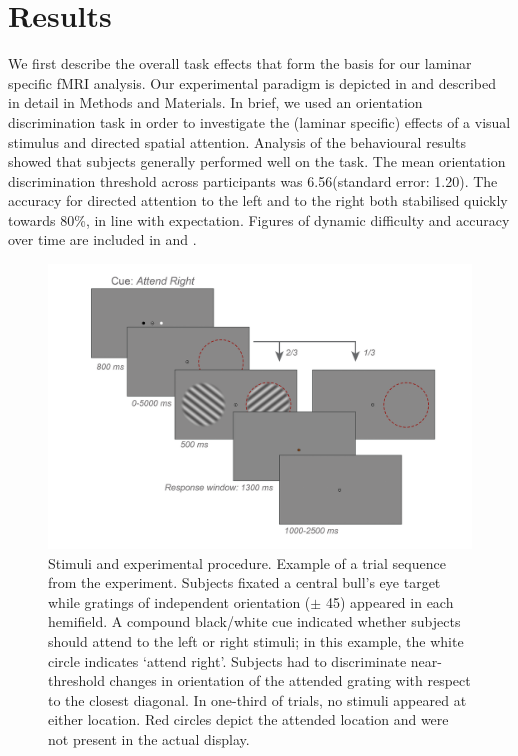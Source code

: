 \documentclass[9pt,lineno]{aperture}
\begin{document}
\section{Results}
We first describe the overall task effects that form the basis for our laminar specific fMRI analysis. Our experimental paradigm is depicted in  and described in detail in Methods and Materials. In brief, we used an orientation discrimination task in order to investigate the (laminar specific) effects of a visual stimulus and directed spatial attention. Analysis of the behavioural results showed that subjects generally performed well on the task. The mean orientation discrimination threshold across participants was 6.56\textdegree (standard error: 1.20\textdegree). The accuracy for directed attention to the left and to the right both stabilised quickly towards 80\%, in line with expectation. Figures of  dynamic difficulty and accuracy over time are included in  and .
\begin{figure}
 \includegraphics[width=\linewidth]{img/experiment.png}
\caption{Stimuli and experimental procedure. Example of a trial sequence from the experiment. Subjects fixated a central bull's eye target while gratings of independent orientation ($\pm$ 45\textdegree) appeared in each hemifield. A compound black/white cue indicated whether subjects should attend to the left or right stimuli; in this example, the white circle indicates `attend right'. Subjects had to discriminate near-threshold changes in orientation of the attended grating with respect to the closest diagonal. In one-third of trials, no stimuli appeared at either location. Red circles depict the attended location and were not present in the actual display.}
\label{fig:experiment}
\end{figure}
\end{document}
